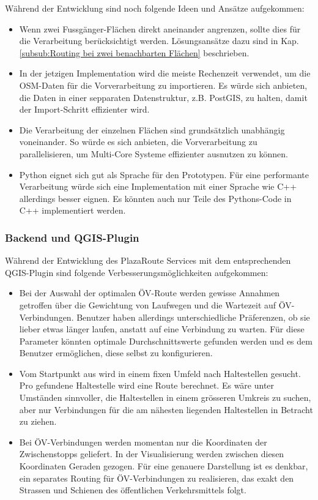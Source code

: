 Während der Entwicklung sind noch folgende Ideen und Ansätze aufgekommen:

\begin{itemize}
    \item Wenn zwei Fussgänger-Flächen direkt aneinander angrenzen, sollte dies für die Verarbeitung berücksichtigt werden. Lösungsansätze dazu sind in Kap. \ref{subsub:Routing bei zwei benachbarten Flächen} beschrieben.
    \item In der jetzigen Implementation wird die meiste Rechenzeit verwendet, um die \ac{OSM}-Daten für die Vorverarbeitung zu importieren. Es würde sich anbieten, die Daten in einer sepparaten Datenstruktur, z.B. PostGIS, zu halten, damit der Import-Schritt effizienter wird.
    \item Die Verarbeitung der einzelnen Flächen sind grundsätzlich unabhängig voneinander. So würde es sich anbieten, die Vorverarbeitung zu parallelisieren, um Multi-Core Systeme effizienter ausnutzen zu können.
    \item Python eignet sich gut als Sprache für den Prototypen. Für eine performante Verarbeitung würde sich eine Implementation mit einer Sprache wie C++ allerdings besser eignen. Es könnten auch nur Teile des Pythons-Code in C++ implementiert werden.
\end{itemize}

\subsubsection{Backend und QGIS-Plugin}
\label{subsub:Weiterentwicklung_Backend_QGIS}

Während der Entwicklung des PlazaRoute Services mit dem entsprechenden QGIS-Plugin sind folgende Verbesserungsmöglichkeiten aufgekommen:

\begin{itemize}
    \item Bei der Auswahl der optimalen ÖV-Route werden gewisse Annahmen getroffen über die Gewichtung von Laufwegen und die Wartezeit auf ÖV-Verbindungen. Benutzer haben allerdings unterschiedliche Präferenzen, ob sie lieber etwas länger laufen, anstatt auf eine Verbindung zu warten. Für diese Parameter könnten optimale Durchschnittswerte gefunden werden und es dem Benutzer ermöglichen, diese selbst zu konfigurieren.
    \item Vom Startpunkt aus wird in einem fixen Umfeld nach Haltestellen gesucht. Pro gefundene Haltestelle wird eine Route berechnet. Es wäre unter Umständen sinnvoller, die Haltestellen in einem grösseren Umkreis zu suchen, aber nur Verbindungen für die am nähesten liegenden Haltestellen in Betracht zu ziehen.
    \item Bei ÖV-Verbindungen werden momentan nur die Koordinaten der Zwischenstopps geliefert. In der Visualisierung werden zwischen diesen Koordinaten Geraden gezogen. Für eine genauere Darstellung ist es denkbar, ein separates Routing für ÖV-Verbindungen zu realisieren, das exakt den Strassen und Schienen des öffentlichen Verkehrsmittels folgt.
\end{itemize}